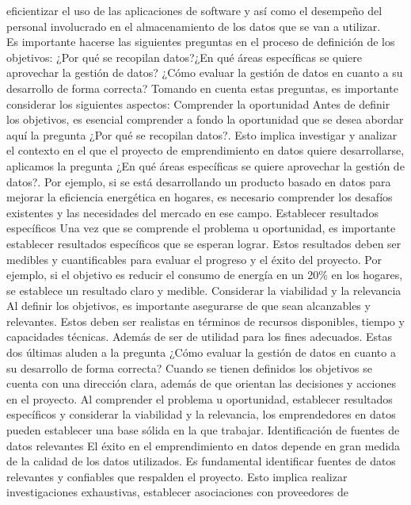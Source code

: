 \documentclass[
  letterpaper,
  DIV=11,
  numbers=noendperiod]{scrreprt}
\begin{document}
eficientizar el uso de las aplicaciones de software y así como el
desempeño del personal involucrado en el almacenamiento de los datos que
se van a utilizar.\\
Es importante hacerse las siguientes preguntas en el proceso de
definición de los objetivos: ¿Por qué se recopilan datos?¿En qué áreas
específicas se quiere aprovechar la gestión de datos? ¿Cómo evaluar la
gestión de datos en cuanto a su desarrollo de forma correcta? Tomando en
cuenta estas preguntas, es importante considerar los siguientes
aspectos: Comprender la oportunidad Antes de definir los objetivos, es
esencial comprender a fondo la oportunidad que se desea abordar aquí la
pregunta ¿Por qué se recopilan datos?. Esto implica investigar y
analizar el contexto en el que el proyecto de emprendimiento en datos
quiere desarrollarse, aplicamos la pregunta ¿En qué áreas específicas se
quiere aprovechar la gestión de datos?. Por ejemplo, si se está
desarrollando un producto basado en datos para mejorar la eficiencia
energética en hogares, es necesario comprender los desafíos existentes y
las necesidades del mercado en ese campo. Establecer resultados
específicos Una vez que se comprende el problema u oportunidad, es
importante establecer resultados específicos que se esperan lograr.
Estos resultados deben ser medibles y cuantificables para evaluar el
progreso y el éxito del proyecto. Por ejemplo, si el objetivo es reducir
el consumo de energía en un 20\% en los hogares, se establece un
resultado claro y medible. Considerar la viabilidad y la relevancia Al
definir los objetivos, es importante asegurarse de que sean alcanzables
y relevantes. Estos deben ser realistas en términos de recursos
disponibles, tiempo y capacidades técnicas. Además de ser de utilidad
para los fines adecuados. Estas dos últimas aluden a la pregunta ¿Cómo
evaluar la gestión de datos en cuanto a su desarrollo de forma correcta?
Cuando se tienen definidos los objetivos se cuenta con una dirección
clara, además de que orientan las decisiones y acciones en el proyecto.
Al comprender el problema u oportunidad, establecer resultados
específicos y considerar la viabilidad y la relevancia, los
emprendedores en datos pueden establecer una base sólida en la que
trabajar. Identificación de fuentes de datos relevantes El éxito en el
emprendimiento en datos depende en gran medida de la calidad de los
datos utilizados. Es fundamental identificar fuentes de datos relevantes
y confiables que respalden el proyecto. Esto implica realizar
investigaciones exhaustivas, establecer asociaciones con proveedores de
\end{document}
